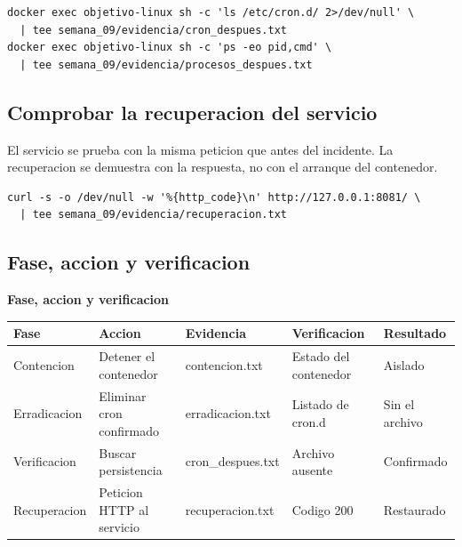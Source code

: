 \documentclass[11pt,a4paper]{article}
\begin{document}
\begin{lstlisting}[style=estiloCodigo]
docker exec objetivo-linux sh -c 'ls /etc/cron.d/ 2>/dev/null' \
  | tee semana_09/evidencia/cron_despues.txt
docker exec objetivo-linux sh -c 'ps -eo pid,cmd' \
  | tee semana_09/evidencia/procesos_despues.txt
\end{lstlisting}

\subsection{Comprobar la recuperacion del servicio}

El servicio se prueba con la misma peticion que antes del incidente. La recuperacion se demuestra con la respuesta, no con el arranque del contenedor.

\begin{lstlisting}[style=estiloCodigo]
curl -s -o /dev/null -w '%{http_code}\n' http://127.0.0.1:8081/ \
  | tee semana_09/evidencia/recuperacion.txt
\end{lstlisting}

\subsection{Fase, accion y verificacion}

\begin{center}
\begin{minipage}{\linewidth}
\centering
{\footnotesize
\textbf{Fase, accion y verificacion}\par\smallskip
\begin{tabular}{@{}>{\raggedright\arraybackslash}p{2.00cm}>{\raggedright\arraybackslash}p{3.20cm}>{\raggedright\arraybackslash}p{2.60cm}>{\raggedright\arraybackslash}p{3.00cm}>{\raggedright\arraybackslash}p{2.20cm}@{}}
\toprule
\textbf{Fase} & \textbf{Accion} & \textbf{Evidencia} & \textbf{Verificacion} & \textbf{Resultado} \\
\midrule
Contencion & Detener el contenedor & contencion.txt & Estado del contenedor & Aislado \\
Erradicacion & Eliminar cron confirmado & erradicacion.txt & Listado de cron.d & Sin el archivo \\
Verificacion & Buscar persistencia & cron\_despues.txt & Archivo ausente & Confirmado \\
Recuperacion & Peticion HTTP al servicio & recuperacion.txt & Codigo 200 & Restaurado \\
\bottomrule
\end{tabular}
}
\par{}
\end{minipage}
\end{center}
\end{document}
